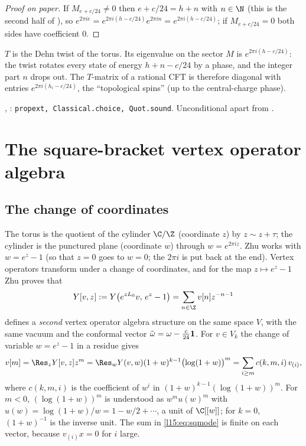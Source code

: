 \begin{proof}[Proof on paper]
If $M_{e+c/24}\neq0$ then $e+c/24=h+n$ with $n\in\N$ (this is the second half of ), so
$e^{2\pi ie}=e^{2\pi i(h-c/24)}e^{2\pi in}=e^{2\pi i(h-c/24)}$; if $M_{e+c/24}=0$ both sides have coefficient $0$.
\end{proof}

\begin{physics}
$T$ is the Dehn twist of the torus. Its eigenvalue on the sector $M$ is $e^{2\pi i(h-c/24)}$: the twist rotates every
state of energy $h+n-c/24$ by a phase, and the integer part $n$ drops out. The $T$-matrix of a rational CFT is therefore
diagonal with entries $e^{2\pi i(h_i-c/24)}$, the ``topological spins'' (up to the central-charge phase).
\end{physics}

\begin{status}
, \allowbreak{}\allowbreak{}: \texttt{propext, Classical.choice, Quot.sound}.
Unconditional apart from .
\end{status}

\section{The square-bracket vertex operator algebra}\label{l15:sec:square}

\subsection{The change of coordinates}

The torus is the quotient of the cylinder $\C/\Z$ (coordinate $z$) by $z\sim z+\tau$; the cylinder is the punctured plane
(coordinate $w$) through $w=e^{2\pi iz}$. Zhu works with $w=e^{z}-1$ (so that $z=0$ goes to $w=0$; the $2\pi i$ is put
back at the end). Vertex operators transform under a change of coordinates, and for the map $z\mapsto e^z-1$ Zhu proves
that
\begin{equation*}
  Y[v,z]:=Y\bigl(e^{zL_0}v,\,e^z-1\bigr)=\sum_{n\in\Z}v[n]z^{-n-1}
\end{equation*}
defines a \emph{second} vertex operator algebra structure on the same space $V$, with the same vacuum and the conformal
vector $\tilde\omega=\omega-\frac{c}{24}\mathbf{1}$. For $v\in V_k$ the change of variable $w=e^z-1$ in a residue gives
\begin{equation}\label{l15:eq:sqmode}
  v[m]=\Res_z Y[v,z]z^m=\Res_w Y(v,w)(1+w)^{k-1}\bigl(\log(1+w)\bigr)^m=\sum_{i\ge m}c(k,m,i)\,v_{(i)},
\end{equation}
where $c(k,m,i)$ is the coefficient of $w^i$ in $(1+w)^{k-1}(\log(1+w))^m$. For $m<0$, $(\log(1+w))^m$ is understood as
$w^m u(w)^m$ with $u(w)=\log(1+w)/w=1-w/2+\cdots$, a unit of $\C[[w]]$; for $k=0$, $(1+w)^{-1}$ is the inverse unit. The
sum in \eqref{l15:eq:sqmode} is finite on each vector, because $v_{(i)}x=0$ for $i$ large.

